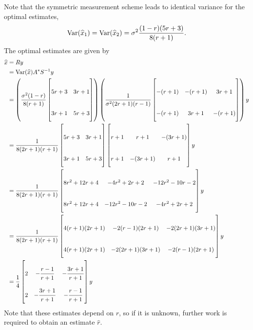\documentclass{homework}
\begin{document}
\begin{solution}
Note that the symmetric  measurement scheme leads to identical variance for the optimal estimates, 
$$\mathrm{Var}(\widehat x_1) = \mathrm{Var}(\widehat x_2) = \sigma^2 \frac{(1-r)(5r+3)}{8(r+1)}.$$ 
The optimal estimates are given by
\begin{align*}
  \hat x &= Ry \\
  &= \Var(\hat x) A^*S^{-1} y \\
  &=\left(\frac{\sigma^2(1 -r)}{8(r+1)} \begin{bmatrix}5r+3&3r+1\\ 3r+1&5r+3\\ \end{bmatrix}\right)
    \left(
      \frac{1}{\sigma^2(2r+1)(r -1)}
      \begin{bmatrix}
	-(r+1)&-(r+1)&3r+1\\
	-(r+1)&3r+1&-(r+1)\\ 
      \end{bmatrix}\right)y\\
    &=\frac{1}{8(2r+1)(r+1)} \begin{bmatrix}5r+3&3r+1\\ 3r+1&5r+3\\ \end{bmatrix}
      \begin{bmatrix}
	r+1&r+1&-(3r+1)\\
	r+1&-(3r+1)&r+1\\ 
      \end{bmatrix}y\\
    &=\frac{1}{8(2r+1)(r+1)}
      \begin{bmatrix}
	8r^2+12r+4 & -4r^2+2r+2  & -12r^2-10r-2\\
	8r^2+12r+4 & -12r^2-10r-2& -4r^2+2r+2\\ 
      \end{bmatrix}y\\
    &=\frac{1}{8(2r+1)(r+1)}
      \begin{bmatrix}
	4(r+1)(2r+1)& -2(r-1 )(2r+1)   &  -2(2r+1)(3r+1 )\\
	4(r+1)(2r+1)& -2(2r+1 )(3r+1)  &  -2(r-1)(2r+1 )\\
      \end{bmatrix} y\\
\renewcommand{\arraystretch}{3}
    &= \frac{1}{4}
      \begin{bmatrix}
	2& -\dfrac{\strut r-1}{\strut r+1}  & -\dfrac{\strut 3r+1}{\strut r+1} \\
	2& -\dfrac{\strut 3r+1}{\strut r+1} & -\dfrac{\strut r-1}{\strut r+1} \\
      \end{bmatrix}y
      \\
\end{align*}
Note that these estimates depend on $r$, so if it is unknown, further work is required to obtain an estimate $\hat r$.


\end{solution}
\end{document}
